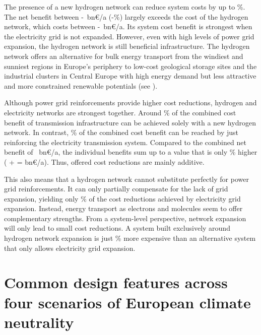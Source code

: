 The presence of a new hydrogen network can reduce system costs by up to
\maxhybenefitrel\%. The net benefit between
\minhybenefitabs-\maxhybenefitabs~bn\euro/a
(\minhybenefitrel-\maxhybenefitrel\%) largely exceeds the cost of the hydrogen
network, which costs between \minhycost-\maxhycost~bn\euro/a. Its system cost
benefit is strongest when the electricity grid is not expanded. However, even
with high levels of power grid expansion, the hydrogen network is still
beneficial infrastructure. The hydrogen network offers an alternative for bulk
energy transport from the windiest and sunniest regions in Europe's periphery to
low-cost geological storage sites and the industrial clusters in Central Europe
with high energy demand but less attractive and more constrained renewable
potentials (see ).

Although power grid reinforcements provide higher cost reductions, hydrogen and
electricity networks are strongest together. Around
\hyoftotalbenefit\% of the combined cost benefit of transmission infrastructure
can be achieved solely with a new hydrogen network. In contrast,
\acoftotalbenefit\% of the combined cost benefit can be reached by just
reinforcing the electricity transmission system. Compared to the combined net
benefit of \gridbenefitabs~bn\euro/a, the individual benefits sum up to a value
that is only \additivebenefitrel\% higher (\maxacbenefitabs{} + \maxhybenefitabs{} =
\additivebenefitabs{} bn\euro/a). Thus, offered cost reductions are mainly
additive.

This also means that a hydrogen network cannot substitute perfectly for power
grid reinforcements. It can only partially compensate for the lack of grid
expansion, yielding only \benefithyofac\% of the cost reductions achieved
by electricity grid expansion. Instead, energy transport as electrons and
molecules seem to offer complementary strengths. From a system-level
perspective, network expansion will only lead to small cost reductions.
A system built exclusively around hydrogen network expansion is just \acvshycost\%
more expensive than an alternative system that only allows electricity grid
expansion.

\section*{Common design features across four scenarios of European climate neutrality}
\label{sec:es}

